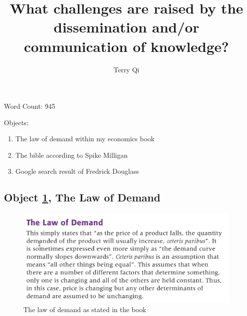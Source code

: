 \documentclass[a4paper,11pt]{article}
\title{What challenges are raised by the dissemination and/or communication of knowledge?}
\author{Terry Qi}
\begin{document}
\maketitle

Word Count: 945

Objects:
\begin{enumerate}
 \item The law of demand within my economics book
 \item The bible according to Spike Milligan
 \item Google search result of Fredrick Douglass
\end{enumerate}

\newpage




\subsection*{Object \ref{fig:lod}, The Law of Demand}

\begin{figure}[h!]
 \centering
 \includegraphics[scale=0.3]{ecobook.png}
 \caption{The law of demand as stated in the book}
 \label{fig:lod}
\end{figure}
\end{document}
